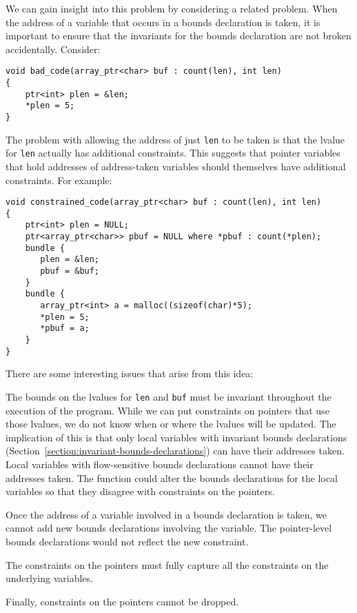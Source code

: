 We can gain insight into this problem by considering a related
problem.   When the address of a variable that occurs in a bounds declaration is 
taken, it is important to ensure that the invariants for the bounds declaration are not
broken accidentally.  Consider:
\begin{verbatim}
void bad_code(array_ptr<char> buf : count(len), int len) 
{
    ptr<int> plen = &len;
    *plen = 5;
}
\end{verbatim}
The problem with allowing the address of just \texttt{len} to be taken is
that the lvalue for \texttt{len} actually has additional constraints. This
suggests that pointer variables that hold addresses of address-taken variables should
themselves have additional constraints.  For example:
\begin{verbatim}
void constrained_code(array_ptr<char> buf : count(len), int len) 
{
    ptr<int> plen = NULL;
    ptr<array_ptr<char>> pbuf = NULL where *pbuf : count(*plen);
    bundle {
       plen = &len;
       pbuf = &buf;
    }
    bundle {
       array_ptr<int> a = malloc((sizeof(char)*5);
       *plen = 5;
       *pbuf = a;
    }
}
\end{verbatim}
There are some interesting issues that arise from this idea:
\begin{compactitem}
\item The bounds on the lvalues for \texttt{len} and
\texttt{buf} must be invariant throughout the execution of the program.
While we can put constraints on pointers that use those lvalues,
we do not know when or where the lvalues will be updated.
The implication of this is that only local variables with invariant
bounds declarations (Section~\ref{section:invariant-bounds-declarations})
can have their addresses taken.   Local variables
with flow-sensitive bounds declarations cannot have their addresses taken.
The function could alter the bounds declarations for the local variables
so that they disagree with constraints on the pointers.
\item Once the address of a variable involved in a bounds declaration 
is taken, we cannot add new bounds declarations involving the variable.
The pointer-level bounds declarations would not reflect the new constraint.
\item The constraints on the pointers must fully capture 
all the constraints on the underlying variables.
\item Finally, constraints on the pointers cannot be dropped.
\end{compactitem}

